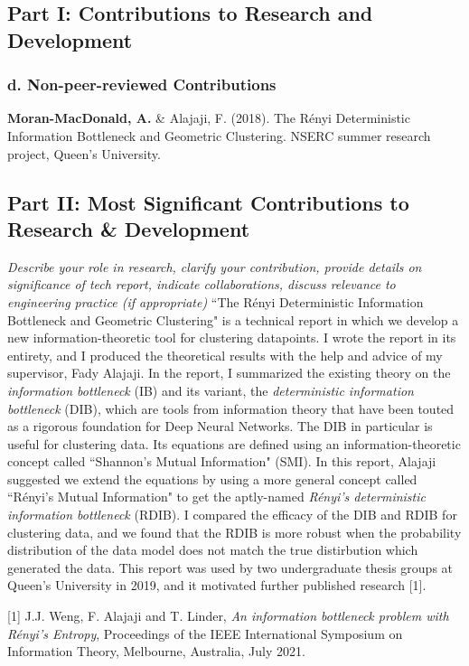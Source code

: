 \documentclass[a4paper,12pt]{article}
\begin{document}
\subsection*{Part I: Contributions to Research and Development}
\subsubsection*{d. Non-peer-reviewed Contributions}
\textbf{Moran-MacDonald, A.} \& Alajaji, F. (2018). The R\'{e}nyi Deterministic
Information Bottleneck and Geometric Clustering. NSERC summer research project,
Queen's University.

\subsection*{Part II: Most Significant Contributions to Research \& Development}
\textit{Describe your role in research, clarify your contribution, provide
    details on significance of tech report, indicate collaborations, discuss
relevance to engineering practice (if appropriate)}
``The R\'{e}nyi Deterministic Information Bottleneck and Geometric
Clustering" is a technical report in which we develop a new
information-theoretic tool for clustering datapoints.
I wrote the report in its entirety, and I produced the theoretical results with
the help and advice of my supervisor, Fady Alajaji.
In the report, I summarized the existing theory on the
\textit{information bottleneck} (IB) and its variant, the \textit{deterministic
information bottleneck} (DIB), which are tools from information theory that
have been touted as a rigorous foundation for Deep Neural Networks. 
The DIB in particular is useful for clustering data.
Its equations are defined using an information-theoretic concept called
``Shannon's Mutual Information" (SMI).
In this report, Alajaji suggested we extend the equations by using a more
general concept called ``R\'{e}nyi's Mutual Information" to get the aptly-named
\textit{R\'{e}nyi's deterministic information bottleneck} (RDIB).
I compared the efficacy of the DIB and RDIB for clustering data, and we found
that the RDIB is more robust when the probability distribution of the data model 
does not match the true distirbution which generated the data.
This report was used by two undergraduate thesis groups at Queen's University in
2019, and it motivated further published research [1].

[1] J.J. Weng, F. Alajaji and T. Linder, \textit{An information bottleneck
problem with R\'{e}nyi's Entropy}, Proceedings of the IEEE International
Symposium on Information Theory, Melbourne, Australia, July 2021.
\end{document}
